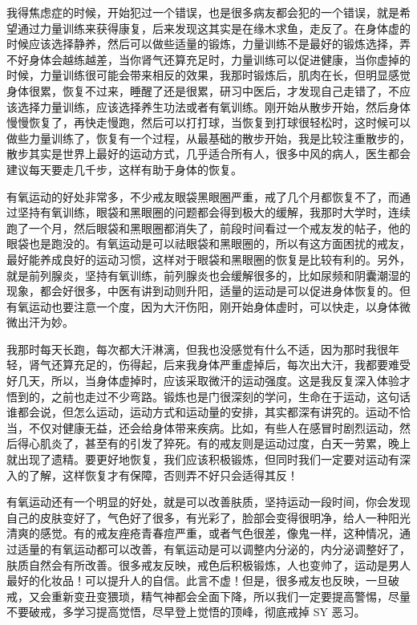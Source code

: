 \documentclass[fontset=founder]{ctexart}
\begin{document}
我得焦虑症的时候，开始犯过一个错误，也是很多病友都会犯的一个错误，就是希望通过力量训练来获得康复，后来发现这其实是在缘木求鱼，走反了。在身体虚的时候应该选择静养，然后可以做些适量的锻炼，力量训练不是最好的锻炼选择，弄不好身体会越练越差，当你肾气还算充足时，力量训练可以促进健康，当你虚掉的时候，力量训练很可能会带来相反的效果，我那时锻炼后，肌肉在长，但明显感觉身体很累，恢复不过来，睡醒了还是很累，研习中医后，才发现自己走错了，不应该选择力量训练，应该选择养生功法或者有氧训练。刚开始从散步开始，然后身体慢慢恢复了，再快走慢跑，然后可以打打球，当恢复到打球很轻松时，这时候可以做些力量训练了，恢复有一个过程，从最基础的散步开始，我是比较注重散步的，散步其实是世界上最好的运动方式，几乎适合所有人，很多中风的病人，医生都会建议每天要走几千步，这样有助于身体的恢复。

有氧运动的好处非常多，不少戒友眼袋黑眼圈严重，戒了几个月都恢复不了，而通过坚持有氧训练，眼袋和黑眼圈的问题都会得到极大的缓解，我那时大学时，连续跑了一个月，然后眼袋和黑眼圈都消失了，前段时间看过一个戒友发的帖子，他的眼袋也是跑没的。有氧运动是可以祛眼袋和黑眼圈的，所以有这方面困扰的戒友，最好能养成良好的运动习惯，这样对于眼袋和黑眼圈的恢复是比较有利的。另外，就是前列腺炎，坚持有氧训练，前列腺炎也会缓解很多的，比如尿频和阴囊潮湿的现象，都会好很多，中医有讲到动则升阳，适量的运动是可以促进身体恢复的。但有氧运动也要注意一个度，因为大汗伤阳，刚开始身体虚时，可以快走，以身体微微出汗为妙。

我那时每天长跑，每次都大汗淋漓，但我也没感觉有什么不适，因为那时我很年轻，肾气还算充足的，伤得起，后来我身体严重虚掉后，每次出大汗，我都要难受好几天，所以，当身体虚掉时，应该采取微汗的运动强度。这是我反复深入体验才悟到的，之前也走过不少弯路。锻炼也是门很深刻的学问，生命在于运动，这句话谁都会说，但怎么运动，运动方式和运动量的安排，其实都深有讲究的。运动不恰当，不仅对健康无益，还会给身体带来疾病。比如，有些人在感冒时剧烈运动，然后得心肌炎了，甚至有的引发了猝死。有的戒友则是运动过度，白天一劳累，晚上就出现了遗精。要更好地恢复，我们应该积极锻炼，但同时我们一定要对运动有深入的了解，这样恢复才有保障，否则弄不好只会适得其反！

有氧运动还有一个明显的好处，就是可以改善肤质，坚持运动一段时间，你会发现自己的皮肤变好了，气色好了很多，有光彩了，脸部会变得很明净，给人一种阳光清爽的感觉。有的戒友痤疮青春痘严重，或者气色很差，像鬼一样，这种情况，通过适量的有氧运动都可以改善，有氧运动是可以调整内分泌的，内分泌调整好了，肤质自然会有所改善。很多戒友反映，戒色后积极锻炼，人也变帅了，运动是男人最好的化妆品！可以提升人的自信。此言不虚！但是，很多戒友也反映，一旦破戒，又会重新变丑变猥琐，精气神都会全面下降，所以我们一定要提高警惕，尽量不要破戒，多学习提高觉悟，尽早登上觉悟的顶峰，彻底戒掉 SY 恶习。
\end{document}
